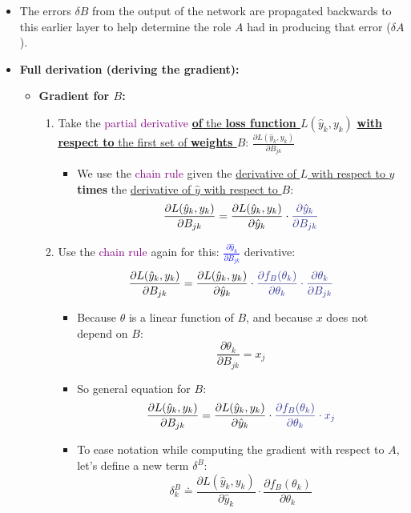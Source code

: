 \documentclass[12pt, a4paper]{article}
\begin{document}
\begin{itemize}
  \item The errors $\delta B$ from the output of the network are propagated backwards to this earlier layer to help determine the role $A$ had in producing that error ($\delta A$).


  \item \textbf{Full derivation (deriving the gradient):}
  \begin{itemize}


    \item \textbf{Gradient for $B$:}
    \begin{enumerate}
      \item Take the \textcolor{Purple}{partial derivative} \uline{\textbf{of} the \textbf{loss function $L(\hat{y}_k, y_k)$}} \uline{\textbf{with respect to} the first set of \textbf{weights $B$}}: $\frac{\partial L(\hat{y}_k, y_k)}{\partial B_{jk}}$
      \begin{itemize}
        \item We use the \textcolor{Purple}{chain rule} given the \uline{derivative of $L$ with respect to $\hat{y}$} \textbf{times} the \uline{derivative of $\hat{y}$ with respect to $B$}:
        $$
        \frac{\partial L(\hat{y}_k, y_k)}{\partial B_{jk}} = \frac{\partial L(\hat{y}_k, y_k)}{\partial \hat{y}_k} \cdot \textcolor{Blue}{\frac{\partial \hat{y}_k}{\partial B_{jk}}}
        $$
      \end{itemize}
      \item Use the \textcolor{Purple}{chain rule} again for this: \textcolor{Blue}{$\frac{\partial \hat{y}_k}{\partial B_{jk}}$} derivative:
      $$
      \frac{\partial L(\hat{y}_k, y_k)}{\partial B_{jk}} = \frac{\partial L(\hat{y}_k, y_k)}{\partial \hat{y}_k} \cdot \textcolor{Blue}{\frac{\partial f_B(\theta_k)}{\partial \theta_k} \cdot \frac{\partial \theta_k}{\partial B_{jk}}}
      $$
      \begin{itemize}
        \item Because $\theta$ is a linear function of $B$, and because $x$ does not depend on $B$:
        $$
        \frac{\partial \theta_k}{\partial B_{jk}} = x_j
        $$
        \item So general equation for $B$:
        $$
        \frac{\partial L(\hat{y}_k, y_k)}{\partial B_{jk}} = \frac{\partial L(\hat{y}_k, y_k)}{\partial \hat{y}_k} \cdot \textcolor{Blue}{\frac{\partial f_B(\theta_k)}{\partial \theta_k} \cdot x_j}
        $$
        \item To ease notation while computing the gradient with respect to $A$, let's define a new term $\delta^B$:
        $$
        \delta_k^B \doteq \frac{\partial L(\hat{y}_k, y_k)}{\partial \hat{y}_k} \cdot \frac{\partial f_B(\theta_k)}{\partial \theta_k}
        $$
      \end{itemize}
    \end{enumerate}
  \end{itemize}



\end{itemize}
\end{document}
